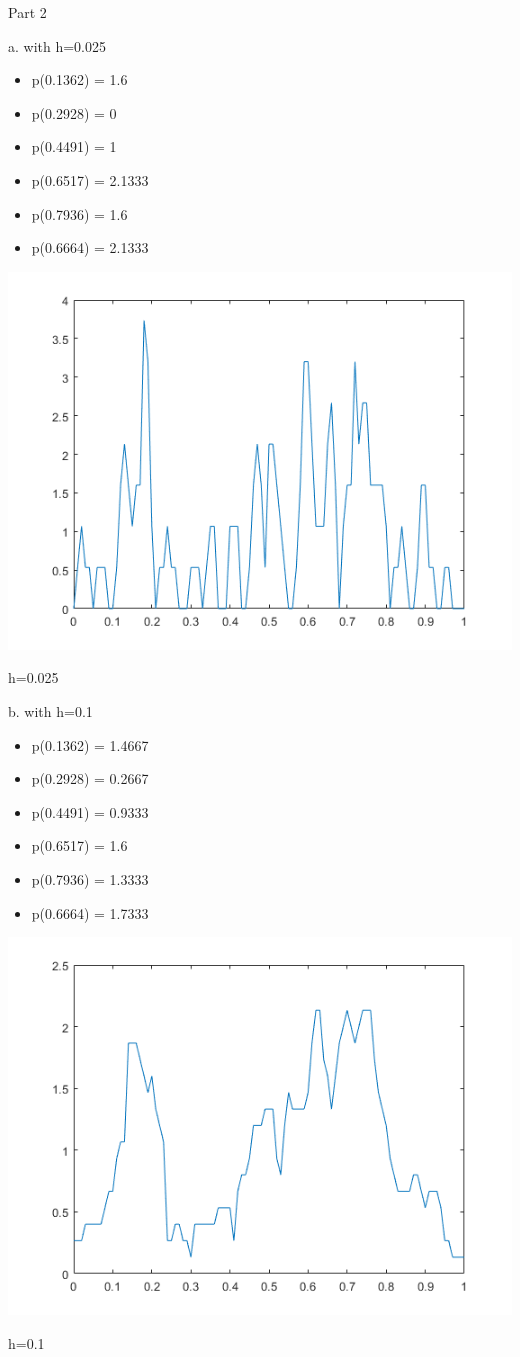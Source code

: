 \documentclass[a4paper]{article}
\begin{document}
Part 2

a.
with h=0.025
\begin{itemize}
    \item p(0.1362) = 1.6
    \item p(0.2928) = 0
    \item p(0.4491) = 1
    \item p(0.6517) = 2.1333
    \item p(0.7936) = 1.6
    \item p(0.6664) = 2.1333
\end{itemize}

\begin{center}
    \includegraphics[scale=1]{3a.png}
    \caption{h=0.025}
\end{center}

b. 
with h=0.1
\begin{itemize}
    \item p(0.1362) = 1.4667
    \item p(0.2928) = 0.2667
    \item p(0.4491) = 0.9333
    \item p(0.6517) = 1.6
    \item p(0.7936) = 1.3333
    \item p(0.6664) = 1.7333
\end{itemize}


\begin{center}
    \includegraphics[scale=1]{3b.png}
    \caption{h=0.1}
\end{center}
\end{document}
